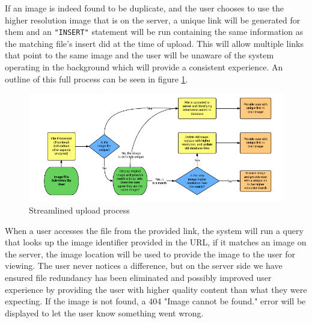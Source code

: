 \documentclass[11pt]{article}
\begin{document}
If an image is indeed found to be duplicate, and the user chooses to use the higher resolution image that is on the server, a unique link will be generated for them and an {\tt "INSERT"} statement will be run containing the same information as the matching file's insert did at the time of upload. This will allow multiple links that point to the same image and the user will be unaware of the system operating in the background which will provide a consistent experience. An outline of this full process can be seen in figure \ref{method-fig1}.

\begin{figure}[htbp]
\centering
\includegraphics[width=6in]{upprocess}
\caption{Streamlined upload process}
\label{method-fig1}
\end{figure}

When a user accesses the file from the provided link, the system will run a query that looks up the image identifier provided in the URL, if it matches an image on the server, the image location will be used to provide the image to the user for viewing. The user never notices a difference, but on the server side we have ensured file redundancy has been eliminated and possibly improved user experience by providing the user with higher quality content than what they were expecting. If the image is not found, a 404 "Image cannot be found." error will be displayed to let the user know something went wrong.

%
%
\end{document}

